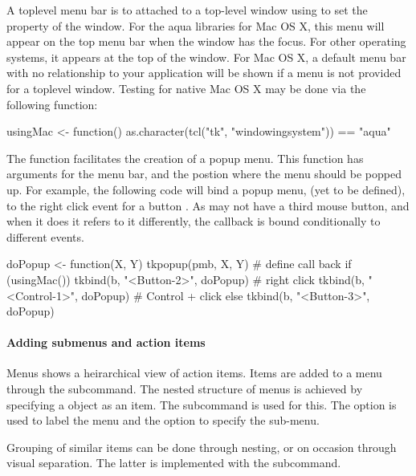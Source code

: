 A toplevel menu bar is to attached to a top-level window using 
to set the  property of the window. For the aqua \TK\/
libraries for Mac OS X, this menu will appear on the top menu bar when
the window has the focus. For other operating systems, it appears at
the top of the window. For Mac OS X, a default menu bar with no
relationship to your application will be shown if a menu is not
provided for a toplevel window. Testing for native Mac OS X may be done via
the following function:
\begin{Schunk}
\begin{Sinput}
 usingMac <- function()  
   as.character(tcl("tk", "windowingsystem")) == "aqua"
\end{Sinput}
\end{Schunk}

The  function facilitates the creation of a popup
menu.  This function has arguments for the menu bar, and the postion
where the menu should be popped up. For example, the following code
will bind a popup menu,  (yet to be defined), to the right click event for a
button . As \OSX\/ may not have a third mouse button, and when
it does it refers to it differently, the callback is bound
conditionally to different events.


\begin{Schunk}
\begin{Sinput}
 doPopup <- function(X, Y) tkpopup(pmb, X, Y) # define call back
 if (usingMac()) {
   tkbind(b, "<Button-2>", doPopup)      # right click
   tkbind(b, "<Control-1>", doPopup)     # Control + click
 } else {
   tkbind(b, "<Button-3>", doPopup)
 }
\end{Sinput}
\end{Schunk}


\paragraph{Adding submenus and action items}
Menus shows a heirarchical view of action items. Items are added to a
menu through the  subcommand.  The nested
structure of menus is achieved by specifying a  object as
an item. The  subcommand is used for
this. The option  is used to label the menu and the
 option to specify the sub-menu.

Grouping of similar items can be done through nesting, or on occasion
through visual separation. The latter is implemented with the  subcommand.


